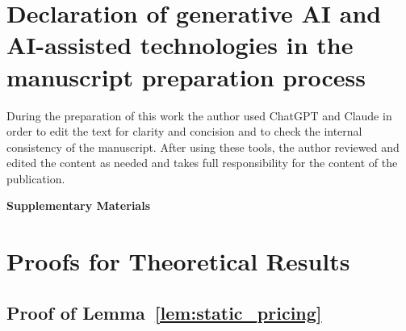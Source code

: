 \documentclass[12pt]{article}
\begin{document}
\section*{Declaration of generative AI and AI-assisted technologies in the manuscript preparation process}
During the preparation of this work the author used ChatGPT and Claude in order to edit the text for clarity and concision and to check the internal consistency of the manuscript. After using these tools, the author reviewed and edited the content as needed and takes full responsibility for the content of the publication.

\newpage
\setlength{\bibsep}{11pt}


\newpage
\appendix
{}
\begin{center}
{\Large\bfseries Supplementary Materials}
\end{center}

\section{Proofs for Theoretical Results}

\subsection{Proof of Lemma~\ref{lem:static_pricing}}
\end{document}
